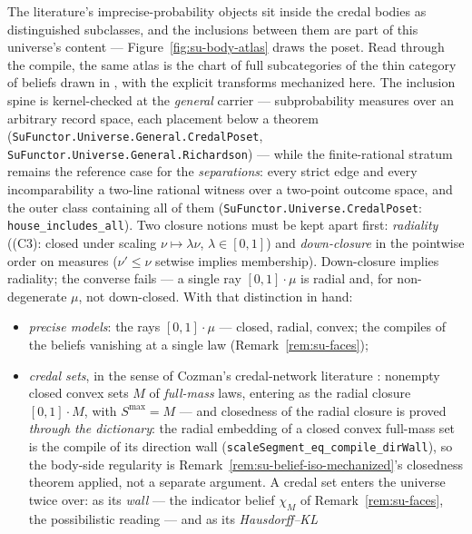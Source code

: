 \begin{remark}
\label{rem:su-body-atlas}
The literature's imprecise-probability objects sit inside the credal
bodies as distinguished subclasses, and the inclusions between them
are part of this universe's content --- Figure~\ref{fig:su-body-atlas}
draws the poset. Read through the compile, the same atlas is the
chart of full subcategories of the thin category of beliefs drawn
in \cite{dalrymple26imprecise}, with the explicit transforms
mechanized here. The inclusion spine is
kernel-checked at the \emph{general} carrier --- subprobability
measures over an arbitrary record space, each placement below a
theorem
(\texttt{SuFunctor.Universe.General.CredalPoset},
\texttt{SuFunctor.Universe.General.Richardson}) --- while the
finite-rational stratum remains the reference case for the
\emph{separations}: every strict edge and every
incomparability a two-line rational witness over a two-point
outcome space, and the outer class containing all of them
(\texttt{SuFunctor.Universe.CredalPoset}:
\texttt{house\_includes\_all}).
Two closure notions must be kept apart first: \emph{radiality}
((C3): closed under scaling $\nu \mapsto \lambda\nu$,
$\lambda \in [0,1]$) and \emph{down-closure} in the pointwise order
on measures ($\nu' \le \nu$ setwise implies membership).
Down-closure implies radiality; the converse fails --- a single ray
$[0,1]\cdot\mu$ is radial and, for non-degenerate $\mu$, not
down-closed. With that distinction in hand:
\begin{itemize}
\item \emph{precise models}: the rays $[0,1] \cdot \mu$ --- closed,
  radial, convex; the compiles of the beliefs vanishing at a
  single law (Remark~\ref{rem:su-faces});
\item \emph{credal sets}, in the sense of Cozman's credal-network
  literature \cite{cozman00}: nonempty closed convex sets $M$ of
  \emph{full-mass} laws, entering as the radial closure
  $[0,1] \cdot M$, with $S^{\max} = M$ --- and closedness of the
  radial closure is proved \emph{through the dictionary}: the
  radial embedding of a closed convex full-mass set is the compile
  of its direction wall
  (\texttt{scaleSegment\_eq\_compile\_dirWall}), so the body-side
  regularity is Remark~\ref{rem:su-belief-iso-mechanized}'s
  closedness theorem applied, not a separate argument. A credal set
  enters the universe twice over: as its \emph{wall} --- the
  indicator belief $\chi_M$ of Remark~\ref{rem:su-faces}, the
  possibilistic reading --- and as its \emph{Hausdorff--KL
}
\end{itemize}
\end{remark}
